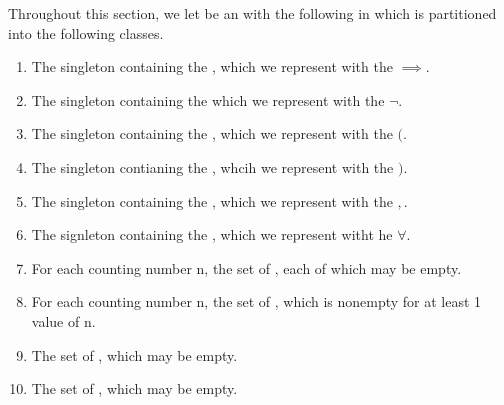 \begin{df}
\label{def:PredicateCalculusSymbols}

\rm
    Throughout this section, we let \scA be an
    \Alphabet with the following \Interpretation in which 
    \scA is partitioned into the following classes.
    \begin{enumerate}
        \item The singleton containing the \Implication \Symbol, which we represent with the \Character $\implies$. 
        \item The singleton containing the \Negation \Symbol which we represent with the \Character $\neg$. 
        \item The singleton containing the \LeftParenthesis \Symbol, which we represent with the \Character $($. 
        \item The singleton contianing the \RightParenthesis \Symbol, whcih we represent with the \Character $)$. 
        \item The singleton containing the \Comma \Symbol, which we represent with the \Character $,$. 
        \item The signleton containing the \UniversalQuantifier, which we represent witht he \Character $\forall$. 
        \item For each counting number n, the set of , each of which may be empty.
        \item For each counting number n, the set of , which is nonempty for at least 1 value of n. 
        \item The set of \IndividualVariables, which may be empty. 
        \item The set of \IndividualConstants, which may be empty. 
    \end{enumerate}
    
\end{df}
